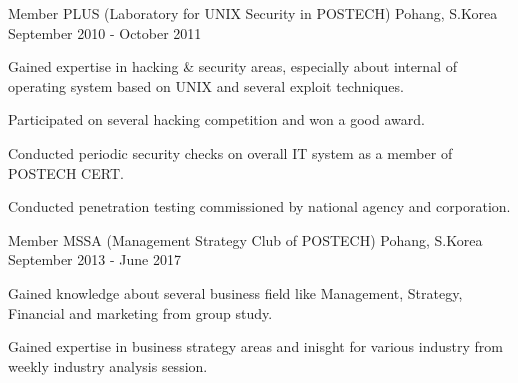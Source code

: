 \begin{cventries}
  \cventry
    {Member} %
    {PLUS (Laboratory for UNIX Security in POSTECH)} %
    {Pohang, S.Korea} %
    {September 2010 - October 2011} %
    {
      \begin{cvitems} %
        \item {Gained expertise in hacking \& security areas, especially about internal of operating system based on UNIX and several exploit techniques.}
        \item {Participated on several hacking competition and won a good award.}
        \item {Conducted periodic security checks on overall IT system as a member of POSTECH CERT.}
        \item {Conducted penetration testing commissioned by national agency and corporation.}
      \end{cvitems}
    }

  \cventry
    {Member} %
    {MSSA (Management Strategy Club of POSTECH)} %
    {Pohang, S.Korea} %
    {September 2013 - June 2017} %
    {
      \begin{cvitems} %
        \item {Gained knowledge about several business field like Management, Strategy, Financial and marketing from group study.}
        \item {Gained expertise in business strategy areas and inisght for various industry from weekly industry analysis session.}
      \end{cvitems}
    }

\end{cventries}
